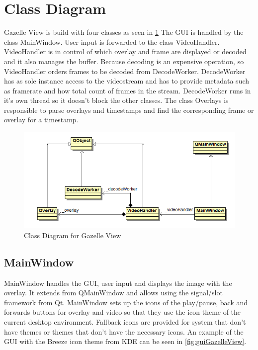 \section{Class Diagram}
Gazelle View is build with four classes as seen in \ref{fig:classDiagram} The GUI is handled by the class MainWindow. User input is forwarded to the class VideoHandler. VideoHandler is in control of which overlay and frame are displayed or decoded and it also manages the buffer. Because decoding is an expensive operation, so VideoHandler orders frames to be decoded from DecodeWorker. DecodeWorker has as sole instance access to the videostream and has to provide metadata such as framerate and how total count of frames in the stream. DecodeWorker runs in it's own thread so it doesn't block the other classes. The class Overlays is responsible to parse overlays and timestamps and find the corresponding frame or overlay for a timestamp.
\begin{figure}[H]
	\centering
	\includegraphics[scale=0.8]{images/classDiagram.png}
	\caption{Class Diagram for Gazelle View}
	\label{fig:classDiagram}
\end{figure}

\subsection{MainWindow}
\label{sec:mainWindow}
MainWindow handles the \gls{GUI}, user input and displays the image with the overlay. It extends from QMainWindow and allows using the signal/slot framework from Qt. 
MainWindow sets up the icons of the play/pause, back and forwards buttons for overlay and video so that they use the icon theme of the current desktop environment. Fallback icons are provided for system that don't have themes or themes that don't have the necessary icons. An example of the \gls{GUI} with the Breeze icon theme from \gls{KDE} can be seen in \ref{fig:guiGazelleView}.

